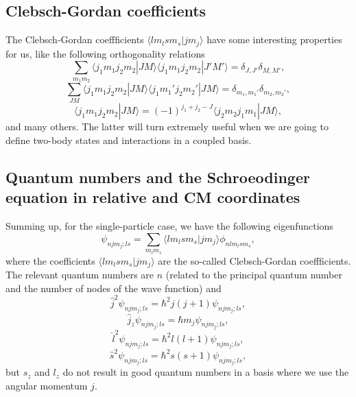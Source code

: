\documentclass[graybox,sectrefs,envcountresetchap,open=right]{svmonodo}
\begin{document}
\subsection{Clebsch-Gordan coefficients}

The Clebsch-Gordan coeffficients $\langle lm_lsm_s|jm_j\rangle$ have some interesting properties for us, like the following  orthogonality relations
\[
\sum_{m_1m_2}\langle j_1m_1j_2m_2|JM\rangle\langle j_1m_1j_2m_2|J'M'\rangle=\delta_{J,J'}\delta_{M,M'},
\]
\[
\sum_{JM}\langle j_1m_1j_2m_2|JM\rangle\langle j_1m_1'j_2m_2'|JM\rangle=\delta_{m_1,m_1'}\delta_{m_2,m_2'},
\]
\[
\langle j_1m_1j_2m_2|JM\rangle=(-1)^{j_1+j_2-J}\langle j_2m_2j_1m_1|JM\rangle,
\]
and many others. The latter will turn extremely useful when we are going to define two-body states and interactions in a coupled basis.

\subsection{Quantum numbers and the Schroeodinger equation in relative and CM coordinates}

Summing up, for the single-particle case, we have the following eigenfunctions 
\[
\psi_{njm_j;ls}=\sum_{m_lm_s}\langle lm_lsm_s|jm_j\rangle\phi_{nlm_lsm_s},
\]
where the coefficients $\langle lm_lsm_s|jm_j\rangle$ are the so-called Clebsch-Gordan coeffficients.
The relevant quantum numbers are $n$ (related to the principal quantum number and the number of nodes of the wave function) and 
\[
   \hat{j}^2\psi_{njm_j;ls}=\hbar^2j(j+1)\psi_{njm_j;ls},
\]
\[
   \hat{j}_z\psi_{njm_j;ls}=\hbar m_j\psi_{njm_j;ls},
\]
\[
   \hat{l}^2\psi_{njm_j;ls}=\hbar^2l(l+1)\psi_{njm_j;ls},
\]
\[
   \hat{s}^2\psi_{njm_j;ls}=\hbar^2s(s+1)\psi_{njm_j;ls},
\]
but $s_z$ and $l_z$ do not result in good quantum numbers in a basis where we
use the angular momentum $j$.
\end{document}
